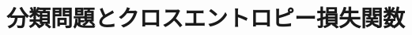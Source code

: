 \documentclass[../../../topic_machine-learning]{subfiles}
\begin{document}
\sectionline
\section{分類問題とクロスエントロピー損失関数}

\todo{}
\end{document}
